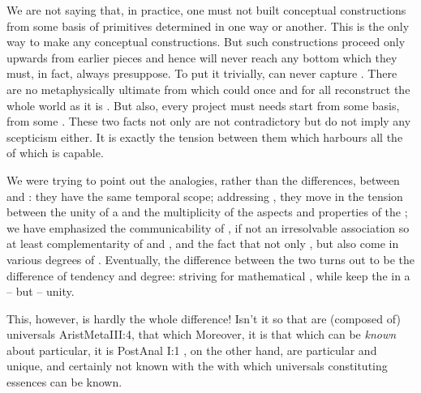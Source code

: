 We are not saying that, in practice, one must not built conceptual constructions
from some basis of primitives determined in one way or another. This is the only
way to make any conceptual constructions.
But such constructions proceed only upwards from earlier  pieces
and hence will never reach any bottom which they must, in fact, always
presuppose. To put it trivially,  can never
capture .
There are no metaphysically ultimate  from which 
could once and for all reconstruct the whole world as it is . But
also, every  project must needs start from some basis, from some
. These two facts not only are not contradictory but do not imply
any scepticism either. It is exactly the tension between them which harbours all
the  of which  is capable. 

%
We were trying to point out the analogies, rather than the differences, between
 and : they have the same temporal scope; addressing
, they move in the tension between the unity of a  and
the multiplicity of the aspects and properties of the ; we have
emphasized the communicability of , if not an irresolvable association
so at least complementarity of  and , and the fact that
not only , but also  come in various degrees of
. Eventually, the difference between the two turns out to be the
difference of tendency and degree:   striving for
mathematical , while  keep the  in a
 -- but  -- unity.

This, however, is hardly the whole difference!  Isn't it so that 
are (composed of) universals \citet{and by the universal we mean that which is
  predicable of 
  the individuals}{AristMeta}{III:4}, that which  Moreover, it is that which can be {\em known} about
particular, it is \citet{implicit in the clearly known particular.}{PostAnal}{
  I:1} , on the other hand, are particular and unique, and
certainly not known with the  with which universals constituting
essences can be known.

